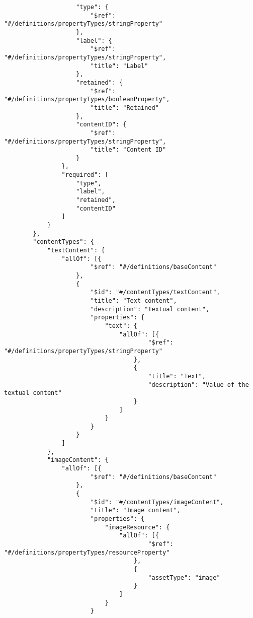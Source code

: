 \begin{appendices}
\begin{lstlisting}
                    "type": {
                        "$ref": "#/definitions/propertyTypes/stringProperty"
                    },
                    "label": {
                        "$ref": "#/definitions/propertyTypes/stringProperty",
                        "title": "Label"
                    },
                    "retained": {
                        "$ref": "#/definitions/propertyTypes/booleanProperty",
                        "title": "Retained"
                    },
                    "contentID": {
                        "$ref": "#/definitions/propertyTypes/stringProperty",
                        "title": "Content ID"
                    }
                },
                "required": [
                    "type",
                    "label",
                    "retained",
                    "contentID"
                ]
            }
        },
        "contentTypes": {
            "textContent": {
                "allOf": [{
                        "$ref": "#/definitions/baseContent"
                    },
                    {
                        "$id": "#/contentTypes/textContent",
                        "title": "Text content",
                        "description": "Textual content",
                        "properties": {
                            "text": {
                                "allOf": [{
                                        "$ref": "#/definitions/propertyTypes/stringProperty"
                                    },
                                    {
                                        "title": "Text",
                                        "description": "Value of the textual content"
                                    }
                                ]
                            }
                        }
                    }
                ]
            },
            "imageContent": {
                "allOf": [{
                        "$ref": "#/definitions/baseContent"
                    },
                    {
                        "$id": "#/contentTypes/imageContent",
                        "title": "Image content",
                        "properties": {
                            "imageResource": {
                                "allOf": [{
                                        "$ref": "#/definitions/propertyTypes/resourceProperty"
                                    },
                                    {
                                        "assetType": "image"
                                    }
                                ]
                            }
                        }

\end{lstlisting}
\end{appendices}
